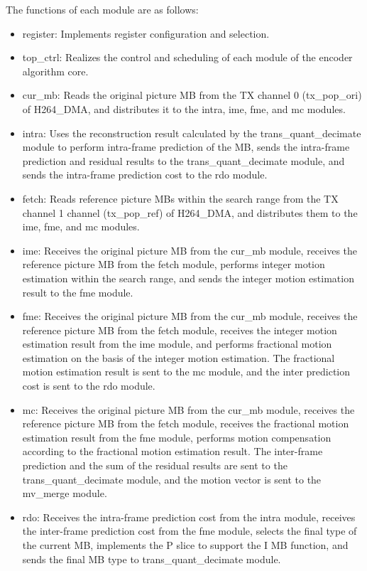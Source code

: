 \documentclass[main\_\_EN.tex]{subfiles}
\begin{document}
The functions of each module are as follows:
\begin{itemize}
    \item register: Implements register configuration and selection.
    \item top\_ctrl: Realizes the control and scheduling of each module of the encoder algorithm core.
    \item cur\_mb: Reads the original picture MB from the TX channel 0 (tx\_pop\_ori) of H264\_DMA, and distributes it to the intra, ime, fme, and mc modules.
    \item intra: Uses the reconstruction result calculated by the trans\_quant\_decimate module to perform intra-frame prediction of the MB, sends the intra-frame prediction and residual results to the trans\_quant\_decimate module, and sends the intra-frame prediction cost to the rdo module.
    \item fetch: Reads reference picture MBs within the search range from the TX channel 1 channel (tx\_pop\_ref) of H264\_DMA, and distributes them to the ime, fme, and mc modules.
    \item ime: Receives the original picture MB from the cur\_mb module, receives the reference picture MB from the fetch module, performs integer motion estimation within the search range, and sends the integer motion estimation result to the fme module.
    \item fme: Receives the original picture MB from the cur\_mb module, receives the reference picture MB from the fetch module, receives the integer motion estimation result from the ime module, and performs fractional motion estimation on the basis of the integer motion estimation. The fractional motion estimation result is sent to the mc module, and the inter prediction cost is sent to the rdo module.
    \item mc: Receives the original picture MB from the cur\_mb module, receives the reference picture MB from the fetch module, receives the fractional motion estimation result from the fme module, performs motion compensation according to the fractional motion estimation result. The inter-frame prediction and the sum of the residual results are sent to the trans\_quant\_decimate module, and the motion vector is sent to the mv\_merge module.
    \item rdo: Receives the intra-frame prediction cost from the intra module, receives the inter-frame prediction cost from the fme module, selects the final type of the current MB, implements the P slice to support the I MB function, and sends the final MB type to trans\_quant\_decimate module.


\end{itemize}
\end{document}
